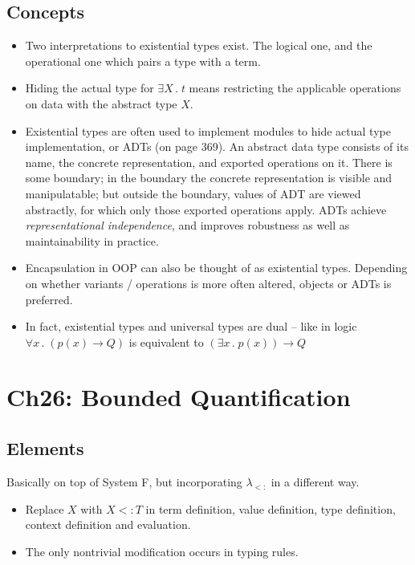 \documentclass{article}
\newcommand{\uquant}[2]{\forall #1 \, .\; #2}
\newcommand{\equant}[2]{\exists #1 \, .\; #2}
\begin{document}
\subsection{Concepts}
  \begin{itemize}
    \item Two interpretations to existential types exist.
      The logical one, and the operational one which pairs a type with a term.
    \item Hiding the actual type for $\equant{X}{t}$ means restricting
      the applicable operations on data with the abstract type $X$.
    \item Existential types are often used to implement modules to hide actual
      type implementation, or ADTs (on page 369).
      An abstract data type consists of its name, the concrete representation, and exported operations on it.
      There is some boundary; in the boundary the concrete representation is visible and manipulatable;
      but outside the boundary, values of ADT are viewed abstractly, for which only those exported operations apply.
      ADTs achieve \emph{representational independence}, and improves robustness as well as maintainability in practice.
    \item Encapsulation in OOP can also be thought of as existential types.
      Depending on whether variants / operations is more often altered, objects or ADTs is preferred.
    \item In fact, existential types and universal types are dual -- like in logic $\uquant{x}{(p(x) \to Q)}$ is equivalent to $(\equant{x}{p(x)}) \to Q$
  \end{itemize}



\section{Ch26: Bounded Quantification}
\subsection{Elements}
  Basically on top of System F, but incorporating $\lambda_{<:}$ in a different way.
\begin{itemize}
  \item Replace $X$ with $X<:T$ in term definition, value definition, type definition, context definition and evaluation.
  \item The only nontrivial modification occurs in typing rules.
\end{itemize}
\end{document}
